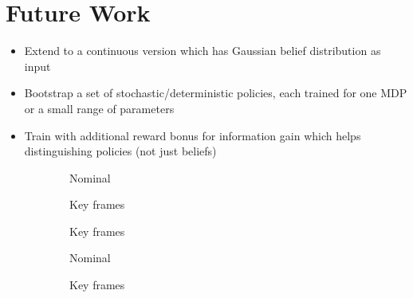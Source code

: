 \documentclass{article}
\begin{document}
\section{Future Work}

\begin{itemize}
    \item Extend to a continuous version which has Gaussian belief distribution as input
    \item Bootstrap a set of stochastic/deterministic policies, each trained for one MDP or a small range of parameters
    \item Train with additional reward bonus for information gain which helps distinguishing policies (not just beliefs)
\end{itemize}


\begin{figure}[t!]
\begin{centering}
\begin{subfigure}[b]{0.3\columnwidth}
\caption{Nominal}
\end{subfigure}
\hfill
\begin{subfigure}[b]{0.3\columnwidth}
\caption{Key frames}
\end{subfigure}
\hfill
\begin{subfigure}[b]{0.3\columnwidth}
\caption{Key frames}
\end{subfigure}
\vfill
\begin{subfigure}[b]{0.3\columnwidth}
\caption{Nominal}
\end{subfigure}
\hfill
\begin{subfigure}[b]{0.3\columnwidth}
\caption{Key frames}
\end{subfigure}
\hfill
\begin{subfigure}[b]{0.3\columnwidth}

\end{subfigure}
\end{centering}
\end{figure}
\end{document}

